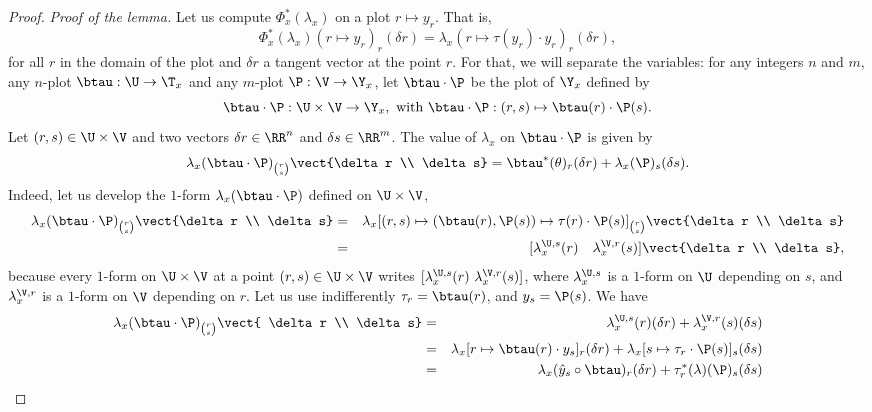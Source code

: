 \begin{proof}
    \smallskip
    \textit{Proof of the lemma.}\hspace{1ex}
    Let us compute $\Phi_x^*(\lambda_x)$ on a plot $r \mapsto y_r$.
    That is,
    $$
      \Phi_x^*(\lambda_x)(r \mapsto y_r)_r(\delta r) = \lambda_x(r \mapsto \tau(y_r) \cdot y_r)_r(\delta r),
      $$
    for all $r$ in the domain of the plot and $\delta r$ a tangent vector at the point $r$.
    For that,
    we will separate the variables:
    for any integers $n$ and $m$,
    any $n$-plot $\btau : \U \to \T_x$ and any $m$-plot $\P : \V \to \Y_x$,
    let $\btau \cdot \P$ be the plot of $\Y_x$ defined by
    $$
      \btau \cdot \P : \U \times \V \to \Y_x,  \text{ with }  \btau \cdot \P : (r,s) \mapsto \btau(r) \cdot \P(s).
      $$
    Let $(r,s) \in \U \times \V$ and two vectors $\delta r \in \RR^n$ and  $\delta s \in \RR^m$.
    The value of $\lambda_x$ on $\btau \cdot \P$ is given by
    $$
      \lambda_x(\btau \cdot \P)_{r \choose s} \vect{\delta r \\ \delta s} = \btau^*(\theta)_r(\delta r) + \lambda_x(\P)_s(\delta s).
      $$
    Indeed,
    let us develop the $1$-form $\lambda_x(\btau \cdot \P)$ defined on $\U \times \V$,
    \begin{eqnarray*}
      \lambda_x(\btau \cdot \P)_{r \choose s} \vect{\delta r \\ \delta s} & = & \lambda_x[(r,s) \mapsto (\btau(r),\P(s)) \mapsto \tau(r) \cdot \P(s)]_{r \choose s}\vect{\delta r \\ \delta s} \\
      & = & [\lambda_x^{\U,s}(r) \quad \lambda_x^{\V,r}(s)] \vect{\delta r \\ \delta s},
    \end{eqnarray*}
    because every $1$-form on $\U \times \V$ at a point $(r,s) \in \U \times \V$ writes $[\lambda_x^{\U,s}(r) \ \lambda_x^{\V,r}(s)]$,
    where $\lambda_x^{\U,s}$ is a $1$-form on $\U$ depending on $s$,
    and $\lambda_x^{\V,r}$ is a $1$-form on $\V$ depending on $r$.
    Let us use indifferently $\tau_r = \btau(r)$,
    and $y_s = \P(s)$.
    We have
    \begin{eqnarray*}
      \lambda_x(\btau \cdot \P)_{r \choose s} \vect{ \delta r \\ \delta s} & = & \lambda_x^{\U,s}(r) (\delta r) + \lambda_x^{\V,r}(s)(\delta s) \\
      & = & \lambda_x[r \mapsto \btau(r) \cdot y_s]_r(\delta r) + \lambda_x[s \mapsto \tau_r \cdot \P(s)]_s(\delta s) \\
      & = & \lambda_x(\hat y_s \circ \btau)_r(\delta r) + \tau_r^*(\lambda)(\P)_s(\delta s) \\

\end{eqnarray*}
\end{proof}
